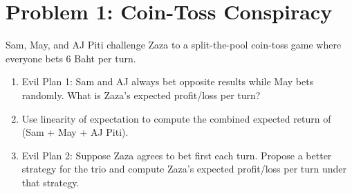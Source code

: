 \newcommand{\hmwkTitle}{Homework 8}
\newcommand{\hmwkDueDate}{Thursday, March 3, 2016}
\newcommand{\hmwkHeaderTitle}{ICCS206 Discrete Mathematic: Homework 8}


\section*{Problem 1: Coin-Toss Conspiracy}
Sam, May, and AJ Piti challenge Zaza to a split-the-pool coin-toss game where everyone bets 6 Baht per turn.
\begin{enumerate}[label=\arabic*.]
    \item Evil Plan 1: Sam and AJ always bet opposite results while May bets randomly. What is Zaza's expected profit/loss per turn?
    \item Use linearity of expectation to compute the combined expected return of (Sam + May + AJ Piti).
    \item Evil Plan 2: Suppose Zaza agrees to bet first each turn. Propose a better strategy for the trio and compute Zaza's expected profit/loss per turn under that strategy.
\end{enumerate}

\medskip
\solution

